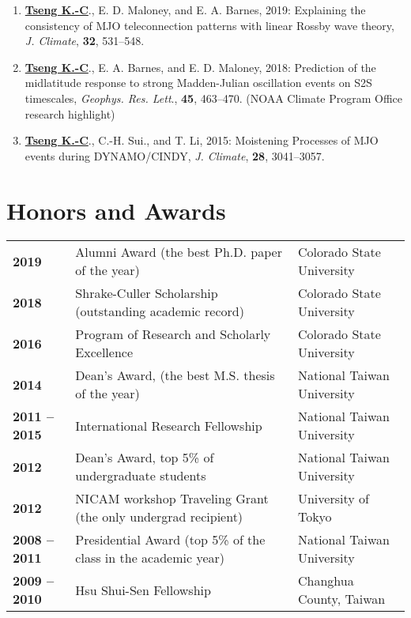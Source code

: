 \documentclass{article}
\begin{document}
\begin{enumerate}
	\item \normalsize{\bf{\underline{Tseng K.-C}}}., E. D. Maloney, and E. A. Barnes, 2019: Explaining the consistency of MJO teleconnection patterns with linear Rossby wave theory, \textit{J. Climate}, \normalsize{\bf{32}}, 531--548.
	\item \normalsize{\bf{\underline{Tseng K.-C}}}., E. A. Barnes, and E. D. Maloney, 2018: Prediction of the midlatitude response to strong Madden-Julian oscillation events on S2S timescales, \textit{Geophys. Res. Lett}., \normalsize{\bf{45}}, 463--470. (NOAA Climate Program Office research highlight)\par
	\item \normalsize{\bf{\underline{Tseng K.-C}}}., C.-H. Sui., and T. Li, 2015: Moistening Processes of MJO events during DYNAMO/CINDY, \textit{J. Climate}, \normalsize{\bf{28}}, 3041--3057.
    \end{enumerate}


\section{\color{airforceblue}Honors and Awards}
\begin{tabular}{>{\bfseries}p{2.5cm}p{10cm}p{\linewidth-2.5cm\relax}}
     2019   & Alumni Award (the best Ph.D. paper of the year) & Colorado State University 
     \\
     2018   & Shrake-Culler Scholarship (outstanding academic record) & Colorado State University 
     \\  
	 2016   & Program of Research and Scholarly Excellence & Colorado State University 
	 \\
     2014  & Dean’s Award, (the best M.S. thesis of the year) & National Taiwan University 
     \\
     2011 -- 2015 & International Research Fellowship & National Taiwan University 
     \\
     2012        & Dean’s Award, top 5\% of undergraduate students & National Taiwan University  
     \\
     2012        & NICAM workshop Traveling Grant (the only undergrad recipient)   & University of Tokyo
     \\  
     2008 -- 2011 & Presidential Award (top 5\% of the class in the academic year) & National Taiwan University 
     \\

     2009 -- 2010 & Hsu Shui-Sen Fellowship   & Changhua County, Taiwan 
     
\end{tabular}
\end{document}
